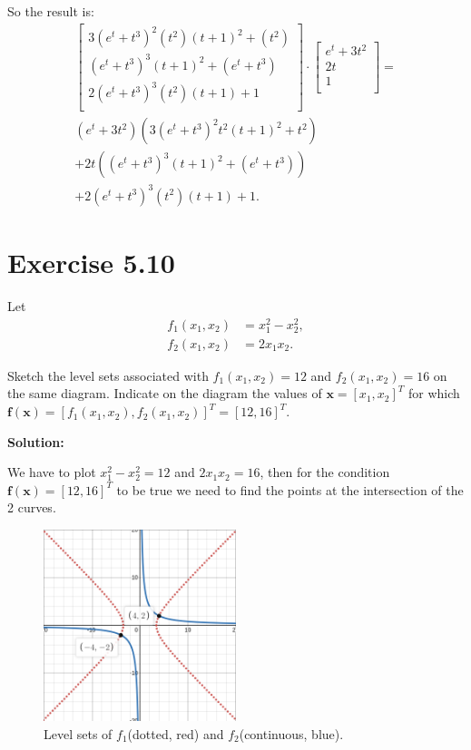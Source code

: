 \documentclass{article}
\begin{document}
So the result is:
\begin{multline*}
\begin{bmatrix}
	3(e^t+t^3)^2(t^2)(t+1)^2+(t^2)\\
	(e^t+t^3)^3(t+1)^2 + (e^t+t^3)\\
	2(e^t+t^3)^3(t^2)(t+1)+1\\
\end{bmatrix}
\cdot
\begin{bmatrix}
	e^t+3t^2\\
	2t\\
	1\\
\end{bmatrix}
=\\
(e^t+3t^2)(3(e^t+t^3)^2t^2(t+1)^2 + t^2)\\
+2t((e^t+t^3)^3(t+1)^2 + (e^t+t^3))\\
+2(e^t+t^3)^3(t^2)(t+1)+1.
\end{multline*}
\section*{Exercise 5.10}
Let
\begin{align*}
	f_1(x_1,x_2)&=x_1^2-x_2^2,\\
	f_2(x_1,x_2)&=2x_1x_2.
\end{align*}

Sketch the level sets associated with $f_1(x_1,x_2)=12$ and $f_2(x_1,x_2)=16$
on the same diagram. Indicate on the diagram the values of
$\boldsymbol{x}=[x_1,x_2]^T$ for which
$\boldsymbol{f}(\boldsymbol{x})=[f_1(x_1,x_2),f_2(x_1,x_2)]^T=[12,16]^T$.

\textbf{Solution:}

We have to plot $x_1^2-x_2^2=12$ and $2x_1x_2=16$, then for the condition
$\boldsymbol{f}(\boldsymbol{x})=[12,16]^T$ to be true we need to find the
points at the intersection of the 2 curves.

\begin{figure}[h]
	\center
	\caption{Level sets of $f_1$(dotted, red) and $f_2$(continuous, blue).}
	\includegraphics[width=0.5\textwidth]{sketch-hw-1.png}
\end{figure}
\end{document}
